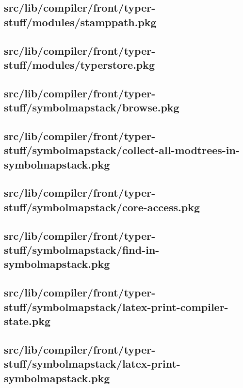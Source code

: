 \subsection{src/lib/compiler/front/typer-stuff/modules/stamppath.pkg}


\subsection{src/lib/compiler/front/typer-stuff/modules/typerstore.pkg}


\subsection{src/lib/compiler/front/typer-stuff/symbolmapstack/browse.pkg}


\subsection{src/lib/compiler/front/typer-stuff/symbolmapstack/collect-all-modtrees-in-symbolmapstack.pkg}


\subsection{src/lib/compiler/front/typer-stuff/symbolmapstack/core-access.pkg}


\subsection{src/lib/compiler/front/typer-stuff/symbolmapstack/find-in-symbolmapstack.pkg}


\subsection{src/lib/compiler/front/typer-stuff/symbolmapstack/latex-print-compiler-state.pkg}


\subsection{src/lib/compiler/front/typer-stuff/symbolmapstack/latex-print-symbolmapstack.pkg}


